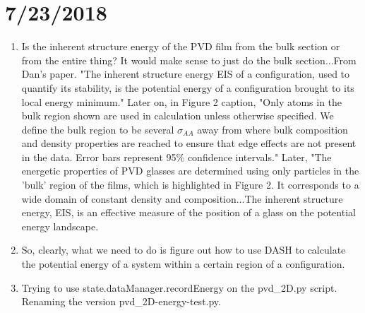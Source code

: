 \documentclass[12pt,reqno]{amsart}
\numberwithin{equation}{section}
\begin{document}
\section{7/23/2018}
\begin{enumerate}
\item Is the inherent structure energy of the PVD film from the bulk section or from the entire thing?  It would make sense to just do the bulk section...From Dan's paper.  "The inherent structure energy EIS of a configuration, used to quantify its stability, is the potential energy of a configuration brought to its local energy minimum."  Later on, in Figure 2 caption, "Only atoms in the bulk region shown are used in calculation unless otherwise specified.  We define the bulk region to be several $\sigma_{AA}$ away from where bulk composition and density properties are reached to ensure that edge effects are not present in the data.  Error bars represent 95\% confidence intervals."  Later, "The energetic properties of PVD glasses are determined using only particles in the 'bulk' region of the films, which is highlighted in Figure 2.  It corresponds to a wide domain of constant density and composition...The inherent structure energy, EIS, is an effective measure of the position of a glass on the potential energy landscape.  
\item So, clearly, what we need to do is figure out how to use DASH to calculate the potential energy of a system within a certain region of a configuration.
\item Trying to use state.dataManager.recordEnergy on the pvd\_2D.py script.  Renaming the version pvd\_2D-energy-test.py.  
\end{enumerate}
\end{document}
